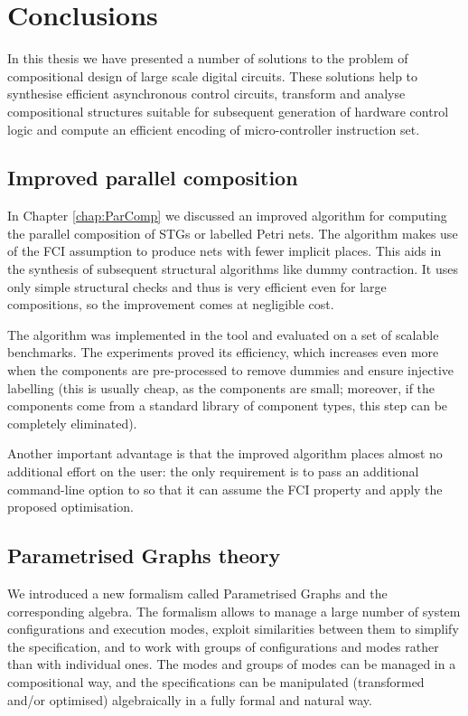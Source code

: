 \chapter{Conclusions\label{chap:Conclusion}}

In this thesis we have presented a number of solutions to the problem
of compositional design of large scale digital circuits. These
solutions help to synthesise efficient asynchronous control circuits,
transform and analyse compositional structures suitable for subsequent
generation of hardware control logic and compute an efficient encoding
of micro-controller instruction set.



\section{Improved parallel composition}
In Chapter \ref{chap:ParComp} we discussed an improved algorithm for
computing the parallel composition of STGs or labelled Petri nets. The
algorithm makes use of the FCI assumption to produce nets with fewer
implicit
places. This aids in the synthesis of  subsequent structural
algorithms like
dummy contraction. It uses only simple structural checks and
thus is very efficient even for large compositions, so the
improvement comes at negligible cost.

The algorithm was implemented in the \pcomp tool and evaluated
on a set of scalable benchmarks. The experiments proved its
efficiency, which increases even more when the components are
pre-processed to remove dummies and ensure injective labelling
(this is usually cheap, as the components are small; moreover,
if the components come from a standard library of component
types, this step can be completely eliminated).

Another important advantage is that the improved algorithm
places almost no additional effort on the user: the only
requirement is to pass an additional command-line option to
\pcomp so that it can assume the FCI property and apply the
proposed optimisation.


\section{Parametrised Graphs theory}

We introduced a new formalism called Parametrised Graphs and the
corresponding algebra. The formalism allows to manage a large number
of system configurations and execution modes, exploit similarities
between them to simplify the specification, and to work with groups
of configurations and modes rather than with individual ones. The
modes and groups of modes can be managed in a compositional way, and
the specifications can be manipulated (transformed and/or optimised)
algebraically in a fully formal and natural way.

